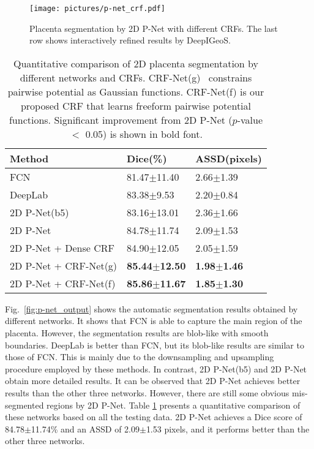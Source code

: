 \documentclass[10pt,journal,compsoc]{IEEEtran}
\begin{document}
\begin{figure}[t]
	\centering
	\texttt{[image: pictures/p-net\_crf.pdf]}
	\caption[Visual comparison of placenta segmentation by 2D P-Net with different CRFs.]{ 
		Placenta segmentation by 2D P-Net with different CRFs. The last row shows interactively refined results by DeepIGeoS.
		} 
	\label{fig:p-net_crf}
\end{figure}


\begin{table}
	\centering
	\small
	\caption{Quantitative comparison of 2D placenta segmentation by different networks and CRFs. CRF-Net(g)~\cite{Zheng2015a} constrains pairwise potential as Gaussian functions. CRF-Net(f) is our proposed CRF that learns freeform pairwise potential functions. Significant improvement from 2D P-Net ($p$-value $<$ 0.05) is shown in bold font.}
	\label{lab:p-net_dice}
	\begin{tabular}{lll}
		
		\hline
		Method & Dice(\%) & ASSD(pixels) \\ \hline
		FCN~\cite{Long2014}       & 81.47$\pm$11.40 & 2.66$\pm$1.39 \\ 
		DeepLab~\cite{Chen2016deeplab}   & 83.38$\pm$9.53  & 2.20$\pm$0.84 \\
		2D P-Net(b5) & 83.16$\pm$13.01 & 2.36$\pm$1.66 \\
		2D P-Net     & 84.78$\pm$11.74 & 2.09$\pm$1.53 \\  
		2D P-Net + Dense CRF & 84.90$\pm$12.05          & 2.05$\pm$1.59 \\ 
		2D P-Net + CRF-Net(g)       & \textbf{85.44$\pm$12.50} & \textbf{1.98$\pm$1.46} \\ 
		2D P-Net + CRF-Net(f)       & \textbf{85.86$\pm$11.67} & \textbf{1.85$\pm$1.30} \\ \hline
	\end{tabular}
\end{table}
	
Fig.~\ref{fig:p-net_output} shows the automatic segmentation results obtained by different networks. It shows that FCN is able to capture the main region of the placenta. However, the segmentation results are blob-like with smooth boundaries. %
DeepLab is better than FCN, but its blob-like results are similar to those of FCN. This is mainly due to the downsampling and upsampling procedure employed by these methods. In contrast, 2D P-Net(b5) and 2D P-Net obtain more detailed results. %
It can be observed that 2D P-Net achieves better results than the other three networks. However, there are still some obvious mis-segmented regions by 2D P-Net. %
Table \ref{lab:p-net_dice} presents a quantitative comparison of these networks based on all the testing data. 2D P-Net achieves a Dice score of 84.78$\pm$11.74\% and an ASSD of 2.09$\pm$1.53 pixels, and it performs better than the other three networks. %
\end{document}
